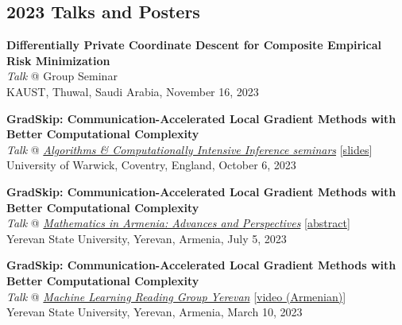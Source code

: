 \documentclass[11pt,a4paper,sans]{moderncv}        %
\begin{document}
\subsection{2023 Talks and Posters}
\begin{etaremune}[resume]
\item \textbf{Differentially Private Coordinate Descent for Composite Empirical Risk Minimization}\\
\textit{Talk} @ Group Seminar \\
KAUST, Thuwal, Saudi Arabia, November 16, 2023

\item \textbf{GradSkip: Communication-Accelerated Local Gradient Methods with Better Computational Complexity}\\
\textit{Talk} @ \textcolor{accent}{\href{https://warwick.ac.uk/fac/sci/statistics/news/algorithms-seminars/\#:\textasciitilde:text=06/10-,Artavazd\%20Maranjyan,-Link\%20opens\%20in}{\textit{Algorithms \& Computationally Intensive Inference seminars}}} [\href{https://warwick.ac.uk/fac/sci/statistics/news/algorithms-seminars/slides_2023_10_06_arto_maranjyan_gradskip.pdf}{slides}]\\
University of Warwick, Coventry, England, October 6, 2023

\item \textbf{GradSkip: Communication-Accelerated Local Gradient Methods with Better Computational Complexity}\\
\textit{Talk} @ \textcolor{accent}{\href{http://mathconf.sci.am/index.html}{\textit{Mathematics in Armenia: Advances and Perspectives}}} [\href{http://mathconf.sci.am/MiA2023AbstractsBook.pdf#page=60}{abstract}]\\
Yerevan State University, Yerevan, Armenia, July 5, 2023

\item \textbf{GradSkip: Communication-Accelerated Local Gradient Methods with Better Computational Complexity}\\
\textit{Talk} @ \textcolor{accent}{\href{https://groups.google.com/g/ml-reading-group-yerevan/c/F_1OGqeFImY/m/BGDIqZAWBQAJ}{\textit{Machine Learning Reading Group Yerevan}}} [\textcolor{orange}{\href{https://www.youtube.com/watch?v=w9iHPgE82oo}{video (Armenian)}}]\\
Yerevan State University, Yerevan, Armenia, March 10, 2023
\end{etaremune}
\end{document}
